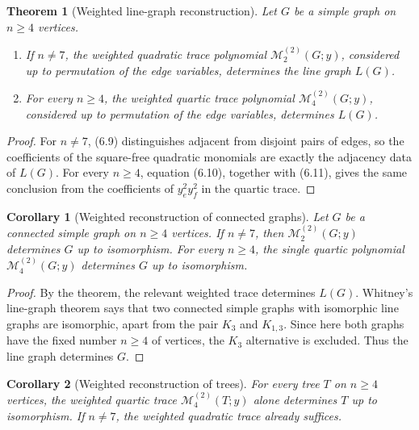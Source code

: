 \documentclass{amsart}
\newtheorem{theorem}{Theorem}
\newtheorem{corollary}{Corollary}
\theoremstyle{definition}
\begin{document}
\begin{theorem}[Weighted line-graph reconstruction]
Let $G$ be a simple graph on $n\geq4$ vertices.
\begin{enumerate}[label=\textup{(\alph*)}]
\item If $n\neq7$, the weighted quadratic trace polynomial
$\mathcal M_2^{(2)}(G;y)$, considered up to permutation of the edge
variables, determines the line graph $L(G)$.
\item For every $n\geq4$, the weighted quartic trace polynomial
$\mathcal M_4^{(2)}(G;y)$, considered up to permutation of the edge
variables, determines $L(G)$.
\end{enumerate}
\end{theorem}

\begin{proof}
For $n\neq7$, (6.9) distinguishes adjacent from disjoint pairs of edges, so
the coefficients of the square-free quadratic monomials are exactly the
adjacency data of $L(G)$.  For every $n\geq4$, equation (6.10), together
with (6.11), gives the same conclusion from the coefficients of
$y_e^2y_f^2$ in the quartic trace.
\end{proof}

\begin{corollary}[Weighted reconstruction of connected graphs]
Let $G$ be a connected simple graph on $n\geq4$ vertices.  If $n\neq7$,
then $\mathcal M_2^{(2)}(G;y)$ determines $G$ up to isomorphism.  For every
$n\geq4$, the single quartic polynomial $\mathcal M_4^{(2)}(G;y)$ determines
$G$ up to isomorphism.
\end{corollary}

\begin{proof}
By the theorem, the relevant weighted trace determines $L(G)$.  Whitney's
line-graph theorem \cite{Whitney} says that two connected simple graphs with
isomorphic line graphs are isomorphic, apart from the pair $K_3$ and
$K_{1,3}$.  Since here both graphs have the fixed number $n\geq4$ of
vertices, the $K_3$ alternative is excluded.  Thus the line graph determines
$G$.
\end{proof}

\begin{corollary}[Weighted reconstruction of trees]
For every tree $T$ on $n\geq4$ vertices, the weighted quartic trace
$\mathcal M_4^{(2)}(T;y)$ alone determines $T$ up to isomorphism.  If
$n\neq7$, the weighted quadratic trace already suffices.
\end{corollary}
\end{document}
